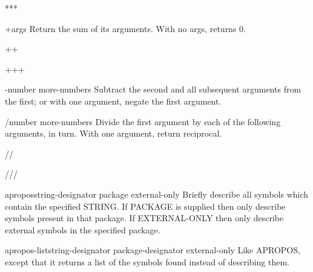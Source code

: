 \begin{variable}{***}{}{}
  
\end{variable}

\begin{variable}{+}{\rest args}{}
  Return the sum of its arguments. With no args, returns 0.
\end{variable}

\begin{variable}{++}{}{}
  
\end{variable}

\begin{variable}{+++}{}{}
  
\end{variable}

\begin{variable}{-}{number \rest more-numbers}{}
  Subtract the second and all subsequent arguments from the first;
  or with one argument, negate the first argument.
\end{variable}

\begin{variable}{/}{number \rest more-numbers}{}
  Divide the first argument by each of the following arguments, in turn.
  With one argument, return reciprocal.
\end{variable}

\begin{variable}{//}{}{}
  
\end{variable}

\begin{variable}{///}{}{}
  
\end{variable}

\begin{function}{apropos}{string-designator \op package external-only}{}
  Briefly describe all symbols which contain the specified STRING.
  If PACKAGE is supplied then only describe symbols present in
  that package. If EXTERNAL-ONLY then only describe
  external symbols in the specified package.
\end{function}

\begin{function}{apropos-list}{string-designator \op package-designator external-only}{}
  Like APROPOS, except that it returns a list of the symbols found instead
  of describing them.
\end{function}

